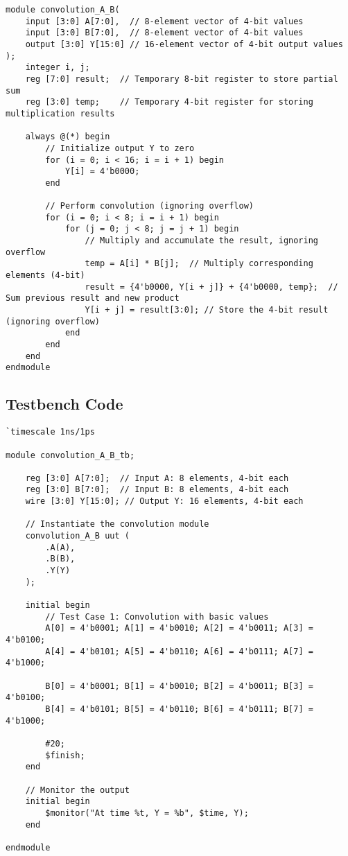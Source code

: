 \documentclass{article}
\begin{document}
\begin{verbatim}
module convolution_A_B(
    input [3:0] A[7:0],  // 8-element vector of 4-bit values
    input [3:0] B[7:0],  // 8-element vector of 4-bit values
    output [3:0] Y[15:0] // 16-element vector of 4-bit output values
);
    integer i, j;
    reg [7:0] result;  // Temporary 8-bit register to store partial sum
    reg [3:0] temp;    // Temporary 4-bit register for storing multiplication results

    always @(*) begin
        // Initialize output Y to zero
        for (i = 0; i < 16; i = i + 1) begin
            Y[i] = 4'b0000;
        end
        
        // Perform convolution (ignoring overflow)
        for (i = 0; i < 8; i = i + 1) begin
            for (j = 0; j < 8; j = j + 1) begin
                // Multiply and accumulate the result, ignoring overflow
                temp = A[i] * B[j];  // Multiply corresponding elements (4-bit)
                result = {4'b0000, Y[i + j]} + {4'b0000, temp};  // Sum previous result and new product
                Y[i + j] = result[3:0]; // Store the 4-bit result (ignoring overflow)
            end
        end
    end
endmodule
\end{verbatim}

\subsection*{Testbench Code}

\begin{verbatim}
`timescale 1ns/1ps

module convolution_A_B_tb;

    reg [3:0] A[7:0];  // Input A: 8 elements, 4-bit each
    reg [3:0] B[7:0];  // Input B: 8 elements, 4-bit each
    wire [3:0] Y[15:0]; // Output Y: 16 elements, 4-bit each

    // Instantiate the convolution module
    convolution_A_B uut (
        .A(A),
        .B(B),
        .Y(Y)
    );

    initial begin
        // Test Case 1: Convolution with basic values
        A[0] = 4'b0001; A[1] = 4'b0010; A[2] = 4'b0011; A[3] = 4'b0100;
        A[4] = 4'b0101; A[5] = 4'b0110; A[6] = 4'b0111; A[7] = 4'b1000;

        B[0] = 4'b0001; B[1] = 4'b0010; B[2] = 4'b0011; B[3] = 4'b0100;
        B[4] = 4'b0101; B[5] = 4'b0110; B[6] = 4'b0111; B[7] = 4'b1000;

        #20;
        $finish;
    end

    // Monitor the output
    initial begin
        $monitor("At time %t, Y = %b", $time, Y);
    end

endmodule
\end{verbatim}
\end{document}
